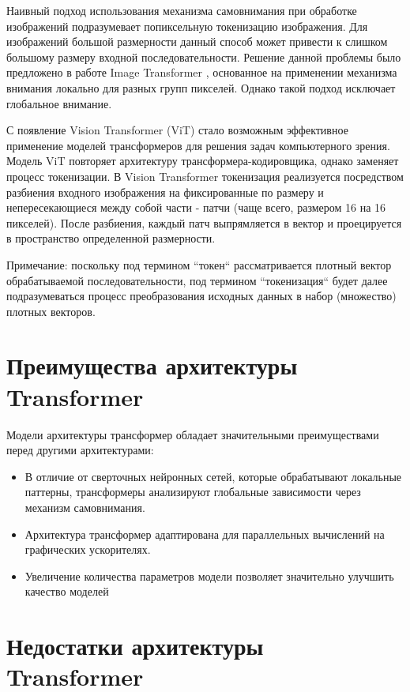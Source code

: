 \documentclass[times,specification,annotation]{itmo-student-thesis}
\begin{document}
Наивный подход использования механизма самовнимания при обработке изображений подразумевает попиксельную токенизацию изображения. Для изображений большой размерности данный способ может привести к слишком большому размеру входной последовательности. Решение данной проблемы было предложено в работе Image Transformer \cite{image_transformer}, основанное на применении механизма внимания локально для разных групп пикселей. Однако такой подход исключает глобальное внимание.

С появление Vision Transformer (ViT) \cite{vit} стало возможным эффективное применение моделей трансформеров для решения задач компьютерного зрения. Модель ViT повторяет архитектуру трансформера-кодировщика, однако заменяет процесс токенизации. В Vision Transformer токенизация реализуется посредством разбиения входного изображения на фиксированные по размеру и непересекающиеся между собой части - патчи (чаще всего, размером 16 на 16 пикселей). После разбиения, каждый патч выпрямляется в вектор и проецируется в пространство определенной размерности. 

Примечание: поскольку под термином ``токен`` рассматривается плотный вектор обрабатываемой последовательности, под термином ``токенизация`` будет далее подразумеваться процесс преобразования исходных данных в набор (множество) плотных векторов.

\section{Преимущества архитектуры Transformer}

Модели архитектуры трансформер обладает значительными преимуществами перед другими архитектурами:

\begin{itemize}
    \item В отличие от сверточных нейронных сетей, которые обрабатывают локальные паттерны, трансформеры анализируют глобальные зависимости через механизм самовнимания.
    \item Архитектура трансформер адаптирована для параллельных вычислений на графических ускорителях.
    \item Увеличение количества параметров модели позволяет значительно улучшить качество моделей \cite{gpt2}
\end{itemize}

\section{Недостатки архитектуры Transformer}
\end{document}
